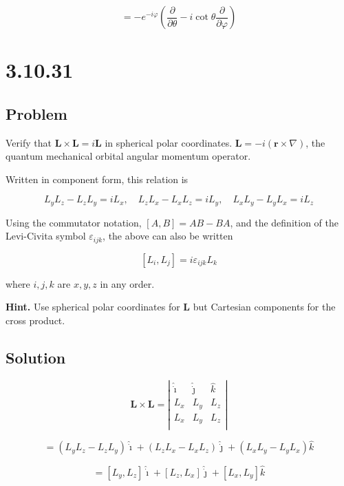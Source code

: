 \documentclass[12pt]{article}
\begin{document}
\[
    = - e^{-i \varphi}
    \left(
    \frac{\partial}{\partial \theta}
    - i \cot{\theta}\frac{\partial}{\partial \varphi}
    \right)
\]

\section{3.10.31}

\subsection{Problem}

Verify that \(\textbf{L} \times \textbf{L} = i \textbf{L}\) in spherical polar coordinates.
\(\textbf{L} = -i \left(\textbf{r} \times \nabla\right)\), the quantum mechanical orbital angular
momentum operator.

Written in component form, this relation is

\[
    L_y L_z - L_z L_y = i L_x , \quad L_z L_x - L_x L_z = i L_y ,\quad L_x L_y - L_y L_x = i L_z
\]

Using the commutator notation, \([A, B] = AB - BA\), and the definition of the Levi-Civita symbol
\(\varepsilon_{ijk}\), the above can also be written

\[
    [L_i, L_j] = i \varepsilon_{ijk} L_k
\]

where \(i , j , k\) are \(x, y, z\) in any order.

\textbf{Hint.} Use spherical polar coordinates for \textbf{L}
but Cartesian components for the cross product.

\subsection{Solution}

\[
    \textbf{L} \times \textbf{L} = \left\lvert \begin{array}{ccc}
        \hat{\dot{\imath}} & \hat{\dot{\jmath}} & \hat{k} \\
        L_x                & L_y                & L_z     \\
        L_x                & L_y                & L_z     \\
    \end{array} \right\rvert
\]

\[
    = \left(L_y L_z - L_z L_y\right) \hat{\dot{\imath}}
    + \left(L_z L_x - L_x L_z\right) \hat{\dot{\jmath}}
    + \left(L_x L_y - L_y L_x\right) \hat{k}
\]

\[
    = [L_y, L_z] \hat{\dot{\imath}} + [L_z, L_x] \hat{\dot{\jmath}} + [L_x, L_y] \hat{k}
\]
\end{document}
